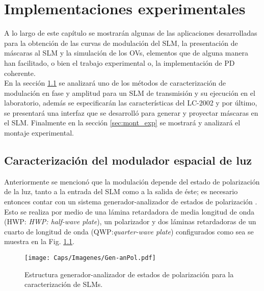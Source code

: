 \chapter{Implementaciones experimentales}
\label{cap:implementacion}

A lo largo de este capítulo se mostrarán algunas de las aplicaciones desarrolladas para la obtención de las curvas de modulación del SLM, la presentación de máscaras al SLM y la simulación de los OVs, elementos que de alguna manera han facilitado, o bien el trabajo experimental o, la implementación de PD coherente.\\


En la sección \ref{sec:slm_carac} se analizará uno de los métodos de caracterización de modulación en fase y amplitud para un SLM de transmisión y su ejecución en el laboratorio, además se especificarán las características del LC-2002 y por último, se presentará una interfaz que se desarrolló para generar y proyectar máscaras en el SLM. Finalmente en la sección \ref{sec:mont_exp} se mostrará y analizará el montaje experimental.

% 

\section{Caracterización del modulador espacial de luz}
\label{sec:slm_carac}
Anteriormente se mencionó que la modulación depende del estado de polarización de la luz, tanto a la entrada del SLM como a la salida de éste; es necesario entonces contar con un sistema generador-analizador de estados de polarización \cite{Campos2000, Iemmi2001, Malacara2007}. Esto se realiza por medio de una lámina retardadora de media longitud de onda (HWP: \textit{HWP: half-wave plate}), un polarizador y dos láminas retardadoras de un cuarto de longitud de onda (QWP:\textit{quarter-wave plate}) configurados como sea se muestra en la Fig. \ref{fig:genpol}.

\begin{figure}[!ht]
  \centering
    \texttt{[image: Caps/Imagenes/Gen-anPol.pdf]}
  \caption{Estructura generador-analizador de estados de polarización para la caracterización de SLMs.}
  \label{fig:genpol}
\end{figure}

